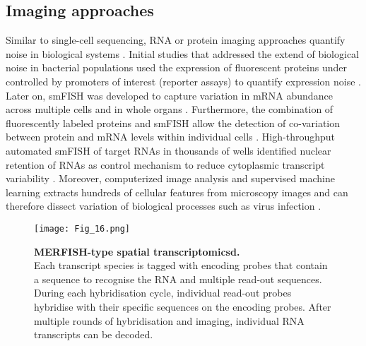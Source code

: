 \subsection{Imaging approaches}

Similar to single-cell sequencing, RNA or protein imaging approaches quantify noise in biological systems \citep{Harton2017a}. Initial studies that addressed the extend of biological noise in bacterial populations used the expression of fluorescent proteins under controlled by promoters of interest (reporter assays) to quantify expression noise \citep{Elowitz2002, Blake2003}. Later on, \gls{smFISH} was developed to capture variation in mRNA abundance across multiple cells \citep{Fang2013a, Lyubimova2013, Sanchez2013} and in whole organs \citep{Yang2014b}. Furthermore, the combination of fluorescently labeled proteins and smFISH allow the detection of co-variation between protein and mRNA levels within individual cells \citep{Taniguchi2011}. High-throughput automated smFISH of target RNAs in thousands of wells \citep{Battich2013} identified nuclear retention of RNAs as control mechanism to reduce cytoplasmic transcript variability \citep{Battich2015a}. Moreover, computerized image analysis and supervised machine learning extracts hundreds of cellular features from microscopy images and can therefore dissect variation of biological processes such as virus infection \citep{Snijder2009}.

\begin{figure}[!h]
\centering
\texttt{[image: Fig\_16.png]}
\caption[MERFISH-type spatial transcriptomics]{\textbf{MERFISH-type spatial transcriptomicsd.}\\
Each transcript species is tagged with encoding probes that contain a sequence to recognise the RNA and multiple read-out sequences. During each hybridisation cycle, individual read-out probes hybridise with their specific sequences on the encoding probes. After multiple rounds of hybridisation and imaging, individual RNA transcripts can be decoded.}
\label{fig0:MERFISH}
\end{figure}

